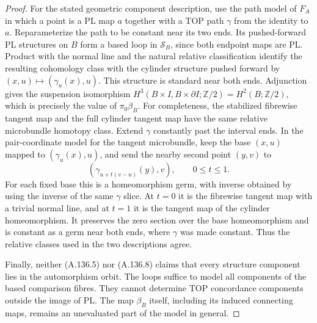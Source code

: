 \begin{proof}
For the stated geometric component description, use the path model
of $F_A$ in which a point is a PL map $a$ together with a TOP path
$\gamma$ from the identity to $a$. Reparameterize the path to be
constant near its two ends. Its pushed-forward PL structures on $B$
form a based loop in $\mathcal S_B$, since both endpoint maps are PL.
Product with the normal line and the natural relative classification
identify the resulting cohomology class with the cylinder structure
pushed forward by $(x,u)\mapsto(\gamma_u(x),u)$. This structure is
standard near both ends. Adjunction gives the suspension isomorphism
$H^3(B\times I,B\times\partial I;\mathbb Z/2)=H^2(B;\mathbb Z/2)$,
which is precisely the value of $\pi_0\beta_B$.
For completeness, the stabilized fibrewise tangent map and the full
cylinder tangent map have the same relative microbundle homotopy
class. Extend $\gamma$ constantly past the interval ends. In the
pair-coordinate model for the tangent microbundle, keep the base
$(x,u)$ mapped to $(\gamma_u(x),u)$, and send the nearby second point
$(y,v)$ to
\[
 (\gamma_{u+t(v-u)}(y),v),\qquad 0\le t\le1.
\]
For each fixed base this is a homeomorphism germ, with inverse obtained
by using the inverse of the same $\gamma$ slice. At $t=0$ it is the
fibrewise tangent map with a trivial normal line, and at $t=1$ it is
the tangent map of the cylinder homeomorphism. It preserves the zero
section over the base homeomorphism and is constant as a germ near both ends, where $\gamma$ was
made constant. Thus the relative classes used in the two descriptions
agree.

Finally, neither (A.136.5) nor (A.136.8) claims that every structure
component lies in the automorphism orbit. The loops suffice to model
all components of the based comparison fibres. They cannot determine
TOP concordance components outside the image of PL. The map
$\beta_B$ itself, including its induced connecting maps, remains an
unevaluated part of the model in general.
\end{proof}
